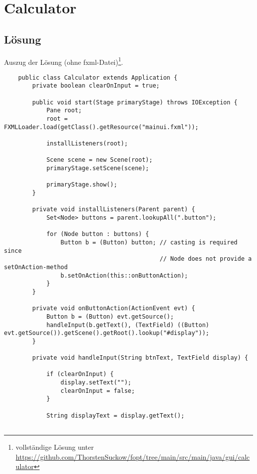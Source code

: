 \section{Calculator}\label{ch:calculator}


\subsection{Lösung}

Auszug der Lösung (ohne fxml-Datei)\footnote{
vollständige Lösung unter \url{https://github.com/ThorstenSuckow/fopt/tree/main/src/main/java/gui/calculator}
}.

\begin{verbatim}
    public class Calculator extends Application {
        private boolean clearOnInput = true;

        public void start(Stage primaryStage) throws IOException {
            Pane root;
            root = FXMLLoader.load(getClass().getResource("mainui.fxml"));

            installListeners(root);

            Scene scene = new Scene(root);
            primaryStage.setScene(scene);

            primaryStage.show();
        }

        private void installListeners(Parent parent) {
            Set<Node> buttons = parent.lookupAll(".button");

            for (Node button : buttons) {
                Button b = (Button) button; // casting is required since
                                            // Node does not provide a setOnAction-method
                b.setOnAction(this::onButtonAction);
            }
        }

        private void onButtonAction(ActionEvent evt) {
            Button b = (Button) evt.getSource();
            handleInput(b.getText(), (TextField) ((Button) evt.getSource()).getScene().getRoot().lookup("#display"));
        }

        private void handleInput(String btnText, TextField display) {

            if (clearOnInput) {
                display.setText("");
                clearOnInput = false;
            }

            String displayText = display.getText();


\end{verbatim}
